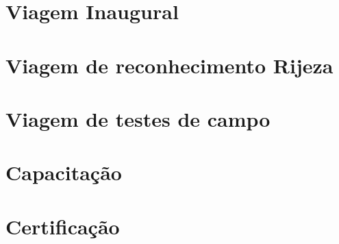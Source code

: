 \documentclass[a4paper,11pt,oneside,brazilian,
draft=false,twocolumn]{report}%
\newcommand*{\standardchapterstyle}{%
  \titleformat{\chapter}[display]
  {\normalfont\huge\bfseries}{\chaptertitlename\ \thechapter}{20pt}{\Huge}
  \titlespacing*{\chapter}{0pt}{50pt}{40pt}
}
\begin{document}
\chapter{Viagem Inaugural}



\chapter{Viagem de reconhecimento Rijeza}



\chapter{Viagem de testes de campo}




\chapter{Capacitação}


\chapter{Certificação}







 
 
%
%
%
%
%
%





%

\standardchapterstyle   
\end{document}
